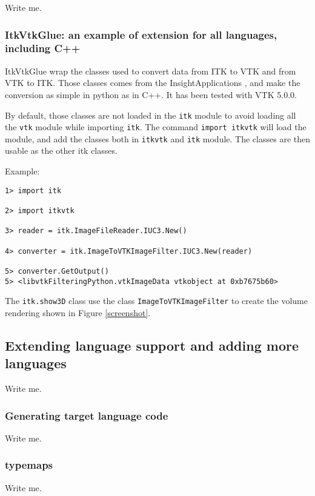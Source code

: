 \documentclass{InsightArticle}
\begin{document}
Write me.

    \subsubsection{ItkVtkGlue: an example of extension for all languages, including C++}

ItkVtkGlue wrap the classes used to convert data from ITK to VTK \cite{VtkWebSite} and from VTK to ITK.
Those classes comes from the InsightApplications \cite{ITKWebSite}, and make the conversion
as simple in python as in C++. It has been tested with VTK 5.0.0.

By default, those classes are not loaded in the \verb$itk$ module to avoid loading
all the \verb$vtk$ module while importing \verb$itk$. The command \verb$import itkvtk$
will load the module, and add the classes both in \verb$itkvtk$ and \verb$itk$ module.
The classes are then usable as the other itk classes.

Example:
\begin{verbatim}
1> import itk

2> import itkvtk

3> reader = itk.ImageFileReader.IUC3.New()

4> converter = itk.ImageToVTKImageFilter.IUC3.New(reader)

5> converter.GetOutput()
5> <libvtkFilteringPython.vtkImageData vtkobject at 0xb7675b60>
\end{verbatim}


The \verb$itk.show3D$ class use the class \verb$ImageToVTKImageFilter$ to create the
volume rendering shown in Figure \ref{screenshot}.

  \subsection{Extending language support and adding more languages}

Write me.

    \subsubsection{Generating target language code}

Write me.

    \subsubsection{typemaps}

Write me.
\end{document}
